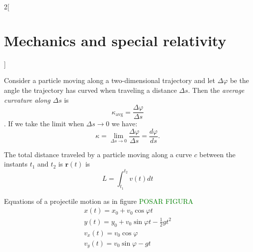 \documentclass[class=article,10pt,crop=false]{standalone}
\begin{document}
\begin{multicols}{2}[\section{Mechanics and special relativity}]
\begin{concept}
\end{concept}
\begin{concept}
Consider a particle moving along a two-dimensional trajectory and let $\Delta\varphi$ be the angle the trajectory has curved when traveling a distance $\Delta s$. Then the \textit{average curvature along $\Delta s$} is $$\kappa_\text{avg}=\frac{\Delta \varphi}{\Delta s}$$. If we take the limit when $\Delta s\to 0$ we have: $$\kappa=\lim_{\Delta s\to 0}\frac{\Delta \varphi}{\Delta s}=\frac{d\varphi}{ds}.$$
\end{concept}
\begin{concept}
The total distance traveled by a particle moving along a curve $c$ between the instants $t_1$ and $t_2$ is $\boldsymbol{r}(t)$ is $$L=\int_{t_1}^{t_2}v(t)dt$$
\end{concept}
\begin{concept}
Equations of a projectile motion as in figure \textcolor{green}{POSAR FIGURA}
\begin{gather*}
    x(t)=x_0+v_0\cos\varphi t\\
    y(t)=y_0+v_0\sin\varphi t-\frac{1}{2}gt^2\\
    v_x(t)=v_0\cos\varphi\\
    v_y(t)=v_0\sin\varphi-gt
\end{gather*}
\end{concept}

\end{multicols}
\end{document}
